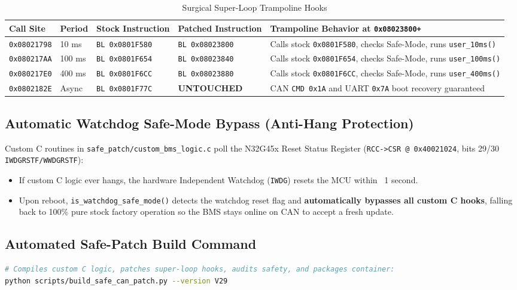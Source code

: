 \documentclass[10pt,a4paper]{article}
\begin{document}
\begin{table}[htbp]
\centering
\caption{Surgical Super-Loop Trampoline Hooks}
\label{tab:superloop_hooks}
\begin{tabularx}{\textwidth}{llllX}
\toprule
\textbf{Call Site} & \textbf{Period} & \textbf{Stock Instruction} & \textbf{Patched Instruction} & \textbf{Trampoline Behavior at \texttt{0x08023800+}} \\
\midrule
\texttt{0x08021798} & 10 ms & \texttt{BL 0x0801F580} & \texttt{BL 0x08023800} & Calls stock \texttt{0x0801F580}, checks Safe-Mode, runs \texttt{user\_10ms()} \\
\texttt{0x080217AA} & 100 ms & \texttt{BL 0x0801F654} & \texttt{BL 0x08023840} & Calls stock \texttt{0x0801F654}, checks Safe-Mode, runs \texttt{user\_100ms()} \\
\texttt{0x080217E0} & 400 ms & \texttt{BL 0x0801F6CC} & \texttt{BL 0x08023880} & Calls stock \texttt{0x0801F6CC}, checks Safe-Mode, runs \texttt{user\_400ms()} \\
\texttt{0x0802182E} & Async & \texttt{BL 0x0801F77C} & \textbf{UNTOUCHED} & CAN \texttt{CMD 0x1A} and UART \texttt{0x7A} boot recovery guaranteed \\
\bottomrule
\end{tabularx}
\end{table}

\subsection{Automatic Watchdog Safe-Mode Bypass (Anti-Hang Protection)}
Custom C routines in \texttt{safe\_patch/custom\_bms\_logic.c} poll the N32G45x Reset Status Register (\texttt{RCC->CSR @ 0x40021024}, bits 29/30 \texttt{IWDGRSTF/WWDGRSTF}):
\begin{itemize}
    \item If custom C logic ever hangs, the hardware Independent Watchdog (\texttt{IWDG}) resets the MCU within ~1 second.
    \item Upon reboot, \texttt{is\_watchdog\_safe\_mode()} detects the watchdog reset flag and \textbf{automatically bypasses all custom C hooks}, falling back to 100\% pure stock factory operation so the BMS stays online on CAN to accept a fresh update.
\end{itemize}

\subsection{Automated Safe-Patch Build Command}
\begin{lstlisting}[language=bash]
# Compiles custom C logic, patches super-loop hooks, audits safety, and packages container:
python scripts/build_safe_can_patch.py --version V29
\end{lstlisting}
\end{document}
